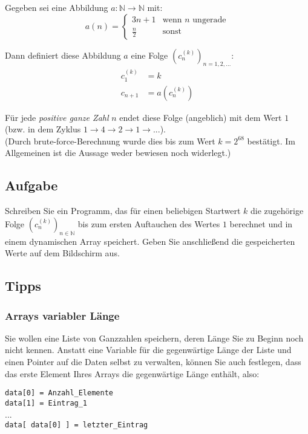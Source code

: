 \documentclass[
	ngerman,
	fontsize=10pt,
	parskip=half,
	titlepage=true,
	DIV=12
]{scrartcl}
\newcommand*{\setNaturals}{\ensuremath{\mathds{N}}}
\begin{document}
Gegeben sei eine Abbildung $a: \setNaturals \to \setNaturals$ mit:
\begin{equation*}
	a(n) = \begin{cases}
		3n + 1 & \text{wenn } n \text{ ungerade} \\
		\frac{n}{2} & \text{sonst}
	\end{cases}
\end{equation*}

Dann definiert diese Abbildung $a$ eine Folge $(c_n^{(k)})_{n=1, 2, \ldots}$:
\begin{align*}
	c_1^{(k)} &= k \\
	c_{n + 1} &= a( c_n^{(k)} )
\end{align*}

Für jede \emph{positive ganze Zahl} $n$ endet diese Folge (angeblich) mit dem Wert $1$ (bzw. in dem Zyklus $1 \to 4 \to 2 \to 1 \to ...$).\\
(Durch brute-force-Berechnung wurde dies bis zum Wert $k=2^{68}$ bestätigt. Im Allgemeinen ist die Aussage weder bewiesen noch widerlegt.)

\subsection{Aufgabe}
Schreiben Sie ein Programm, das für einen beliebigen Startwert $k$ die zugehörige Folge $(c_n^{(k)})_{n \in \setNaturals}$ bis zum ersten Auftauchen des Wertes $1$ berechnet und in einem dynamischen Array speichert. Geben Sie anschließend die gespeicherten Werte auf dem Bildschirm aus.

\subsection{Tipps}
\subsubsection{Arrays variabler Länge}
Sie wollen eine Liste von Ganzzahlen speichern, deren Länge Sie zu Beginn noch nicht kennen. Anstatt eine Variable für die gegenwärtige Länge der Liste und einen Pointer auf die Daten selbst zu verwalten, können Sie auch festlegen, dass das erste Element Ihres Arrays die gegenwärtige Länge enthält, also:

\texttt{data[0] = Anzahl\_Elemente}\\
\texttt{data[1] = Eintrag\_1} \\
...\\
\texttt{data[ data[0] ] = letzter\_Eintrag}
\end{document}
